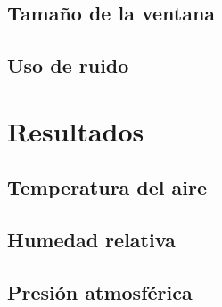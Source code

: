 \subsection{Tamaño de la ventana}

\subsection{Uso de ruido}

\section{Resultados}
\subsection{Temperatura del aire}
\subsection{Humedad relativa}
\subsection{Presión atmosférica}

